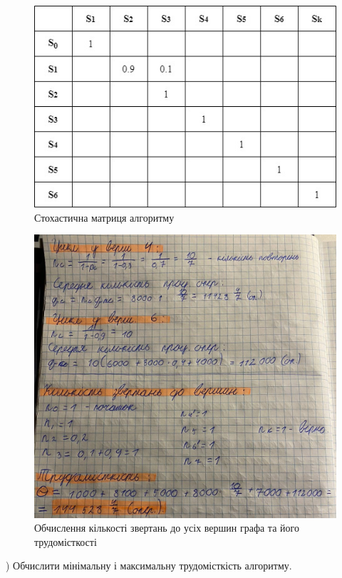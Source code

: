 \begin{figure}[h!]
    \centering
    \includegraphics[width=14cm]{reports/algos/lab1/assets/10.jpg}
    \caption{Стохастична матриця алгоритму}
\end{figure}

\begin{figure}[h!]
    \centering
    \includegraphics[width=14cm]{reports/algos/lab1/assets/11.jpg}
    \caption{Обчислення кількості звертань до усіх вершин графа та його трудомісткості}
\end{figure}

) Обчислити мінімальну і максимальну трудомісткість алгоритму.

